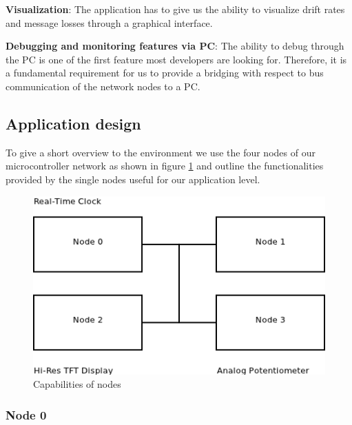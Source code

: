\begin{req}
\label{req:app:visualization}
\textbf{Visualization}: The application has to give us the ability to visualize drift rates and message losses through a graphical interface.
\end{req}

\begin{req}
\label{req:app:debug_and_monitor}
\textbf{Debugging and monitoring features via PC}: The ability to debug through the PC is one of the first feature most developers are looking for. Therefore, it is a fundamental requirement for us to provide a bridging with respect to bus communication of the network nodes to a PC.
\end{req}


\subsection{Application design}
\label{sec:app:specification:design}

To give a short overview to the environment we use the four nodes of our microcontroller network as shown in figure \ref{fig:app:specification:node_overview}  
and outline the functionalities provided by the single nodes useful for our application level.\\

\begin{figure}[h]
 \centering
 \includegraphics[scale=0.5]{../images/node_overview.png}
 \caption{Capabilities of nodes}
 \label{fig:app:specification:node_overview}
\end{figure}

\subsubsection{Node 0}
\label{sec:app:specification:node0}


